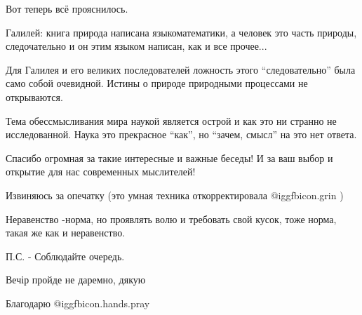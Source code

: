 \begin{multicols}{2}

Вот теперь всё прояснилось.


Галилей:  книга природа написана языкоматематики, а человек  это часть природы,
следочательно и он этим языком написан, как и все прочее...

\begin{itemize} %

Для Галилея и его великих последователей ложность этого \enquote{следовательно} была
само собой очевидной. Истины о природе природными процессами не открываются.

\end{itemize} %


Тема обессмысливания мира наукой является острой и как это ни странно не
исследованной. Наука это прекрасное \enquote{как}, но \enquote{зачем, смысл} на
это нет ответа.


Спасибо огромная за такие интересные и важные беседы! И за ваш выбор и открытие
для нас современных мыслителей!

\begin{itemize} %
Извиняюсь за опечатку (это умная техника откорректировала @igg{fbicon.grin} )
\end{itemize} %


Неравенство -норма, но проявлять волю и требовать свой кусок, тоже норма, такая же как и неравенство.

П.С. - Соблюдайте очередь.

Вечір пройде не даремно, дякую

Благодарю  @igg{fbicon.hands.pray} 

\end{multicols}
